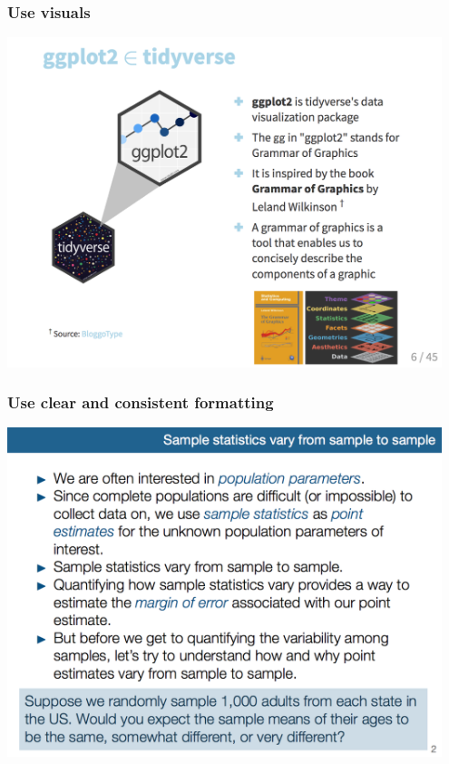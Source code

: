 \documentclass{beamer}
\begin{document}
\begin{frame}
\frametitle{Use visuals}

\begin{center}
\includegraphics[width = 0.95\textwidth]{figures/visuals}
\end{center}

\vfill

\end{frame}


\begin{frame}
\frametitle{Use clear and consistent formatting}

\begin{center}
\includegraphics[width = 0.95\textwidth]{figures/disc-question}
\end{center}

\vfill

\end{frame}
\end{document}
